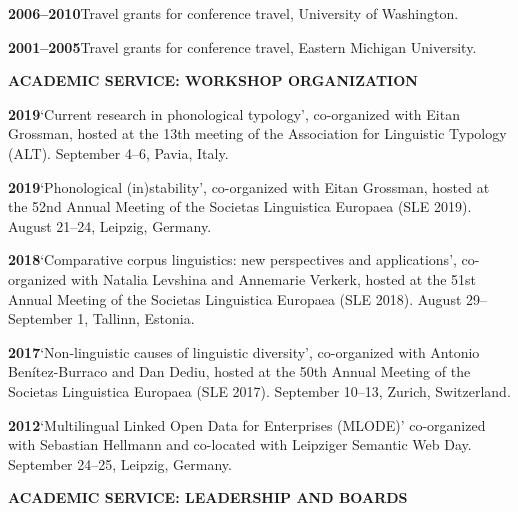 \documentclass[11pt]{article}
\newcommand{\hangpara}{
 \setlength{\parindent}{0in} %
 \hangindent=0.42in %
}
\begin{document}
\vskip 6pt
\hangpara
{\bf 2006--2010}\hspace{1ex}Travel grants for conference travel, University of Washington.

\vskip 6pt
\hangpara
{\bf 2001--2005}\hspace{1ex}Travel grants for conference travel, Eastern Michigan University.

\vskip 20pt
\begin{flushleft}
{\bf ACADEMIC SERVICE: WORKSHOP ORGANIZATION}
\end{flushleft}


\hangpara
{\bf 2019}\hspace{1ex}`Current research in phonological typology', co-organized with Eitan Grossman, hosted at the 13th meeting of the Association for Linguistic Typology (ALT). September 4--6, Pavia, Italy.

\hangpara
\vskip 6pt
{\bf 2019}\hspace{1ex}`Phonological (in)stability', co-organized with Eitan Grossman, hosted at the 52nd Annual Meeting of the Societas Linguistica Europaea (SLE 2019). August 21--24, Leipzig, Germany.

\hangpara
\vskip 6pt
{\bf 2018}\hspace{1ex}`Comparative corpus linguistics: new perspectives and applications', co-organized with Natalia Levshina and Annemarie Verkerk, hosted at the 51st Annual Meeting of the Societas Linguistica Europaea (SLE 2018). August 29--September 1, Tallinn, Estonia.

\hangpara
\vskip 6pt
{\bf 2017}\hspace{1ex}`Non-linguistic causes of linguistic diversity', co-organized with Antonio Benítez-Burraco and Dan Dediu, hosted at the 50th Annual Meeting of the Societas Linguistica Europaea (SLE 2017). September 10--13, Zurich, Switzerland.

\vskip 6pt
\hangpara
{\bf 2012}\hspace{1ex}`Multilingual Linked Open Data for Enterprises (MLODE)' co-organized with Sebastian Hellmann and co-located with Leipziger Semantic Web Day. September 24--25, Leipzig, Germany.


\vskip 20pt
\begin{flushleft}
{\bf ACADEMIC SERVICE: LEADERSHIP AND BOARDS}
\end{flushleft}
\end{document}
